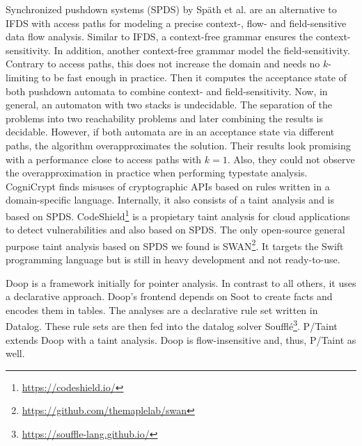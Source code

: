 \documentclass[../draft.tex]{subfiles}
\begin{document}
    Synchronized pushdown systems (SPDS) by Späth et al.\cite{Spaeth2019} are an alternative to IFDS with access paths for modeling a precise context-, flow- and field-sensitive data flow analysis. 
    Similar to IFDS, a context-free grammar ensures the context-sensitivity. 
    In addition, another context-free grammar model the field-sensitivity.
    Contrary to access paths, this does not increase the domain and needs no $k$-limiting to be fast enough in practice. 
    Then it computes the acceptance state of both pushdown automata to combine context- and field-sensitivity. 
    Now, in general, an automaton with two stacks is undecidable. 
    The separation of the problems into two reachability problems and later combining the results is decidable. 
    However, if both automata are in an acceptance state via different paths, the algorithm overapproximates the solution. 
    Their results look promising with a performance close to access paths with $k=1$.
    Also, they could not observe the overapproximation in practice when performing typestate analysis.\\
    CogniCrypt \cite{Krueger2017} finds misuses of cryptographic APIs based on rules written in a domain-specific language.
    Internally, it also consists of a taint analysis and is based on SPDS.
    CodeShield\footnote{\url{https://codeshield.io/}} is a propietary taint analysis for cloud applications to detect vulnerabilities and also based on SPDS.
    The only open-source general purpose taint analysis based on SPDS we found is SWAN\footnote{\url{https://github.com/themaplelab/swan}}. 
    It targets the Swift programming language but is still in heavy development and not ready-to-use.

    Doop\cite{Bravenboer2009} is a framework initially for pointer analysis. 
    In contrast to all others, it uses a declarative approach. 
    Doop's frontend depends on Soot to create facts and encodes them in tables. 
    The analyses are a declarative rule set written in Datalog. 
    These rule sets are then fed into the datalog solver Soufflé\footnote{\url{https://souffle-lang.github.io/}}. 
    P/Taint\cite{Grech2017} extends Doop with a taint analysis. 
    Doop is flow-insensitive and, thus, P/Taint as well.
\end{document}

